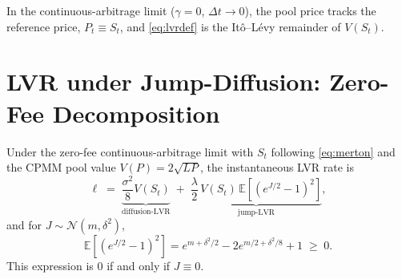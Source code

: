 \documentclass[runningheads]{llncs}
\newcommand{\E}{\mathbb{E}}
\newcommand{\dt}{\Delta t}
\newcommand{\1}{\mathbf{1}}
\begin{document}
In the continuous-arbitrage limit ($\gamma = 0$, $\dt \to 0$), the pool price tracks the reference price, $P_t \equiv S_t$, and \eqref{eq:lvrdef} is the It\^o--L\'evy remainder of $V(S_t)$.

\section{LVR under Jump-Diffusion: Zero-Fee Decomposition}\label{sec:zerofees}

\begin{theorem}\label{thm:decomp}
Under the zero-fee continuous-arbitrage limit with $S_t$ following \eqref{eq:merton} and the CPMM pool value $V(P) = 2\sqrt{LP}$, the instantaneous LVR rate is
\begin{equation}\label{eq:thm1}
\ell \;=\; \underbrace{\frac{\sigma^2}{8} V(S_t)}_{\text{diffusion-LVR}} \;+\; \underbrace{\frac{\lambda}{2}\,V(S_t)\,\E[(e^{J/2} - 1)^2]}_{\text{jump-LVR}},
\end{equation}
and for $J \sim \mathcal{N}(m, \delta^2)$,
\[
\E[(e^{J/2} - 1)^2] = e^{m + \delta^2/2} - 2 e^{m/2 + \delta^2/8} + 1 \;\geq\; 0.
\]
This expression is $0$ if and only if $J \equiv 0$.
\end{theorem}
\end{document}
